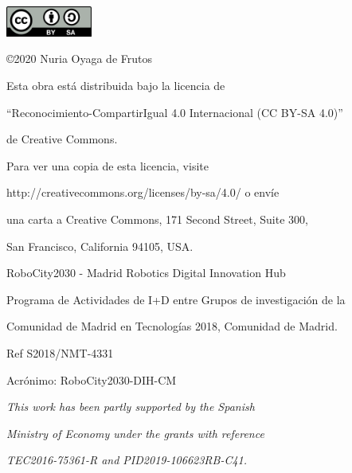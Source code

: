 \begin{flushright}

\includegraphics[height=1.0cm]{figures/CC-BY-SA.png}

\vspace*{0.5cm}

\copyright 2020 Nuria Oyaga de Frutos

\vspace*{0.3cm}

Esta obra está distribuida bajo la licencia de 

``Reconocimiento-CompartirIgual 4.0 Internacional (CC BY-SA 4.0)''

de Creative Commons.

\vspace{0.2cm}

Para ver una copia de esta licencia, visite

http://creativecommons.org/licenses/by-sa/4.0/ o envíe

una carta a Creative Commons, 171 Second Street, Suite 300,

San Francisco, California 94105, USA.

\end{flushright}


\pagebreak
\thispagestyle{empty}
\vspace*{13cm}

\begin{flushright}

RoboCity2030 - Madrid Robotics Digital Innovation Hub

Programa de Actividades de I+D entre Grupos de investigación de la 

Comunidad de Madrid en Tecnologías 2018, Comunidad de Madrid.

Ref S2018/NMT-4331

Acrónimo: RoboCity2030-DIH-CM

\vspace*{1cm}

\textit{This work has been partly supported by the Spanish}

\textit{Ministry of Economy under the grants with reference}

\textit{TEC2016-75361-R and PID2019-106623RB-C41.}

\end{flushright}